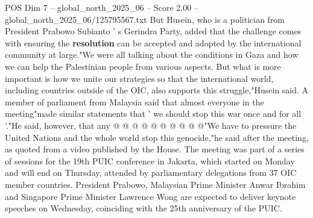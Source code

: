 \begin{textsample}{POS Dim 7 – global\_north\_2025\_06 – Score 2.00 – global\_north\_2025\_06/125795567.txt}
But Husein, who is a politician from President Prabowo Subianto ' s Gerindra Party, added that the challenge comes with ensuring the \textbf{resolution} can be accepted and adopted by the international community at large."We were all talking about the conditions in Gaza and how we can help the Palestinian people from various aspects.
But what is more important is how we unite our strategies so that the international world, including countries outside of the OIC, also supports this struggle,"Husein said.
A member of parliament from Malaysia said that almost everyone in the meeting"made similar statements that ' we should stop this war once and for all '."He said, however, that any @ @ @ @ @ @ @ @ @ @"We have to pressure the United Nations and the whole world stop this genocide,"he said after the meeting, as quoted from a video published by the House.
The meeting was part of a series of sessions for the 19th PUIC conference in Jakarta, which started on Monday and will end on Thursday, attended by parliamentary delegations from 37 OIC member countries.
President Prabowo, Malaysian Prime Minister Anwar Ibrahim and Singapore Prime Minister Lawrence Wong are expected to deliver keynote speeches on Wednesday, coinciding with the 25th anniversary of the PUIC.

\end{textsample}

